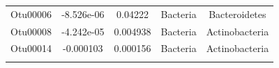 \documentclass[]{article}
\begin{document}
\begin{longtable}[]{@{}ccccc@{}}
\begin{minipage}[t]{0.13\columnwidth}\centering\strut
Otu00006\strut
\end{minipage} & \begin{minipage}[t]{0.16\columnwidth}\centering\strut
-8.526e-06\strut
\end{minipage} & \begin{minipage}[t]{0.14\columnwidth}\centering\strut
0.04222\strut
\end{minipage} & \begin{minipage}[t]{0.13\columnwidth}\centering\strut
Bacteria\strut
\end{minipage} & \begin{minipage}[t]{0.20\columnwidth}\centering\strut
Bacteroidetes\strut
\end{minipage}\tabularnewline
\begin{minipage}[t]{0.13\columnwidth}\centering\strut
Otu00008\strut
\end{minipage} & \begin{minipage}[t]{0.16\columnwidth}\centering\strut
-4.242e-05\strut
\end{minipage} & \begin{minipage}[t]{0.14\columnwidth}\centering\strut
0.004938\strut
\end{minipage} & \begin{minipage}[t]{0.13\columnwidth}\centering\strut
Bacteria\strut
\end{minipage} & \begin{minipage}[t]{0.20\columnwidth}\centering\strut
Actinobacteria\strut
\end{minipage}\tabularnewline
\begin{minipage}[t]{0.13\columnwidth}\centering\strut
Otu00014\strut
\end{minipage} & \begin{minipage}[t]{0.16\columnwidth}\centering\strut
-0.000103\strut
\end{minipage} & \begin{minipage}[t]{0.14\columnwidth}\centering\strut
0.000156\strut
\end{minipage} & \begin{minipage}[t]{0.13\columnwidth}\centering\strut
Bacteria\strut
\end{minipage} & \begin{minipage}[t]{0.20\columnwidth}\centering\strut
Actinobacteria\strut
\end{minipage}\tabularnewline
\begin{minipage}[t]{0.13\columnwidth}\centering\strut

\end{minipage}
\end{longtable}
\end{document}
